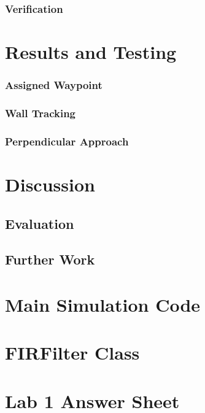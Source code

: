 \documentclass[11pt]{article}
\begin{document}
\subsubsection{Verification}

\pagebreak

\section{Results and Testing}
\subsubsection{Assigned Waypoint}
\subsubsection{Wall Tracking}
\subsubsection{Perpendicular Approach}

\pagebreak
\section{Discussion}
\subsection{Evaluation}
\subsection{Further Work}

\pagebreak



\pagebreak
\appendix
\section{Main Simulation Code}

\pagebreak
\section{FIRFilter Class}

\section{Lab 1 Answer Sheet}
\end{document}
